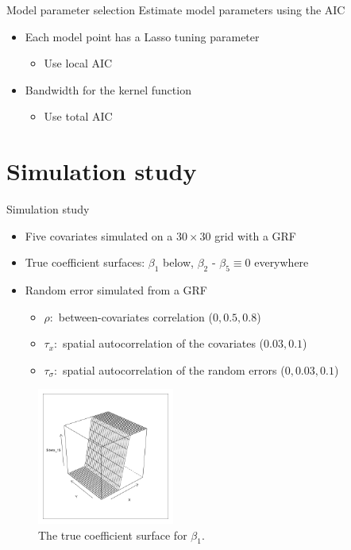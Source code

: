 \documentclass{beamer}
\begin{document}
\begin{frame}{Model parameter selection}
Estimate model parameters using the AIC
\begin{itemize}
	\item Each model point has a Lasso tuning parameter
	\begin{itemize}
		\item Use local AIC
	\end{itemize}
	
	\item Bandwidth for the kernel function
	\begin{itemize}
		\item Use total AIC
	\end{itemize}
\end{itemize}
\end{frame}


\section{Simulation study}

\begin{frame}{Simulation study} 

\begin{itemize}
	\item Five covariates simulated on a $30 \times 30$ grid with a GRF
	\item True coefficient surfaces: $\beta_1$ below, $\beta_2$ - $\beta_5 \equiv 0$ everywhere
	\item Random error simulated from a GRF
	\begin{itemize}
		\item $\rho:$ between-covariates correlation ($0, 0.5, 0.8$)
		\item $\tau_x:$ spatial autocorrelation of the covariates ($0.03, 0.1$)
		\item $\tau_\sigma:$ spatial autocorrelation of the random errors ($0, 0.03, 0.1$)
	\end{itemize}
\end{itemize}
\vspace{-4mm}
\begin{figure}
\begin{center}
	\includegraphics[width=0.4\textwidth]{../../figures/simulation/illustrations/beta1-actual}
	\caption{The true coefficient surface for $\beta_1$.}
\end{center}
\end{figure}
\end{frame} 
\end{document}
